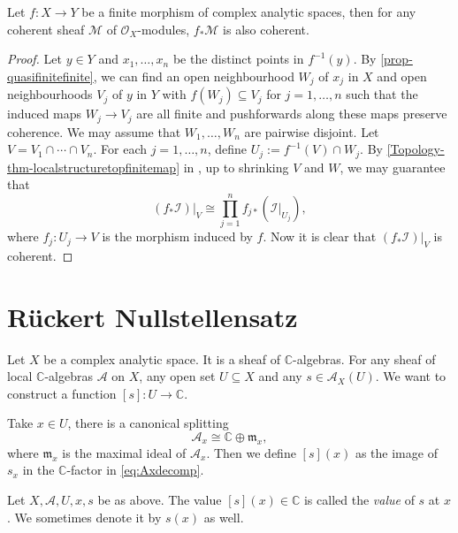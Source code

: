 \begin{theorem}\label{thm-finitepushcoherent}
    Let $f:X\rightarrow Y$ be a finite morphism of complex analytic spaces, then for any coherent sheaf $\mathcal{M}$ of $\mathcal{O}_X$-modules, $f_*\mathcal{M}$ is also coherent.
\end{theorem}
\begin{proof}
    Let $y\in Y$ and $x_1,\ldots,x_n$ be the distinct points in $f^{-1}(y)$. By \cref{prop-quasifinitefinite}, we can find an open neighbourhood $W_j$ of $x_j$ in $X$ and open neighbourhoods $V_j$ of $y$ in $Y$ with $f(W_j)\subseteq V_j$ for $j=1,\ldots,n$ such that the induced maps $W_j\rightarrow V_j$ are all finite and pushforwards along these maps preserve coherence. We may assume that $W_1,\ldots,W_n$ are pairwise disjoint.
    Let $V=V_1\cap \cdots\cap V_n$. For each $j=1,\ldots,n$, define $U_j:=f^{-1}(V)\cap W_j$. By \cref{Topology-thm-localstructuretopfinitemap} in , up to shrinking $V$ and $W$, we may guarantee that
    \[
        (f_*\mathcal{I})|_V\cong \prod_{j=1}^n f_{j*}(\mathcal{I}|_{U_j}),
    \]
    where $f_j:U_j\rightarrow V$ is the morphism induced by $f$. Now it is clear that $(f_*\mathcal{I})|_V$ is coherent.
\end{proof}






\section{Rückert Nullstellensatz}

Let $X$ be a complex analytic space. It is a sheaf of $\mathbb{C}$-algebras.
For any sheaf of local $\mathbb{C}$-algebras $\mathcal{A}$ on $X$, any open set $U\subseteq X$ and any $s\in \mathcal{A}_X(U)$. We want to construct a function $[s]:U\rightarrow \mathbb{C}$.

Take $x\in U$, there is a canonical splitting
\begin{equation}\label{eq:Axdecomp}
  \mathcal{A}_{x}\cong \mathbb{C}\oplus \mathfrak{m}_{x}, 
\end{equation}
where $\mathfrak{m}_x$ is the maximal ideal of $\mathcal{A}_{x}$. Then we define $[s](x)$ as the image of $s_x$ in the $\mathbb{C}$-factor in \eqref{eq:Axdecomp}.

\begin{definition}\label{def-valuesectionatapoint}
    Let $X,\mathcal{A},U,x,s$ be as above. The value $[s](x)\in \mathbb{C}$ is called the \emph{value} of $s$ at $x$. We sometimes denote it by $s(x)$ as well.
\end{definition}

